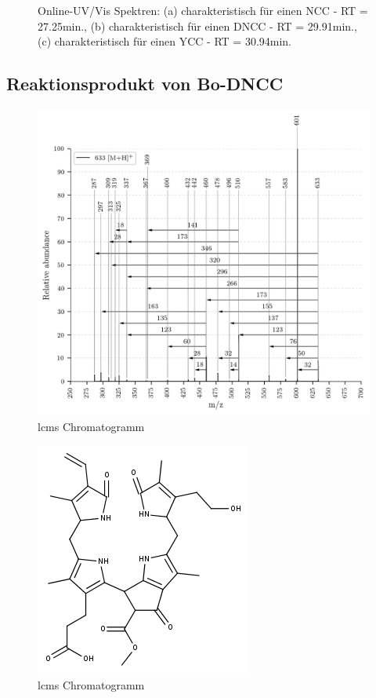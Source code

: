 \begin{figure}[!htbp]
\begin{subfigure}[b]{0.5\textwidth}
    \caption{}
    \label{fig:DNCC2991}
  \end{subfigure}
  \caption[Online-UV/Vis Spektren mit der Charakteristik eines NCC bei 27.10min., eines DNCC bei 29.75min. sowie eines YCC bei 30.94min., Quelle: Autor]{Online-UV/Vis Spektren: (a) charakteristisch für einen \gls{NCC} - RT = 27.25min., (b) charakteristisch für einen \gls{DNCC} - RT = 29.91min., (c) charakteristisch für einen \gls{YCC} - RT = 30.94min.}
\end{figure}

\subsection{Reaktionsprodukt von Bo-DNCC}

\begin{figure}[!htbp]
  \centering
  \includegraphics[width=\textwidth, height=0.7\textwidth]{figures/Kapitel7/Kataboliten/VWA_MS_633.png}
  \caption[LC-MS Chromatogramm vor der Reaktion, Quelle: Author]{\gls{lcms} Chromatogramm}
  \label{fig:LCMSChromatogramm}
\end{figure}

\begin{figure}[!htbp]
  \centering
  \includegraphics[scale=0.6]{figures/Kapitel7/Kataboliten/fragmentation_structures/VWA_Katabolit_633.png}
  \caption[LC-MS Chromatogramm vor der Reaktion, Quelle: Author]{\gls{lcms} Chromatogramm}
  \label{fig:LCMSChromatogramm}
\end{figure}

